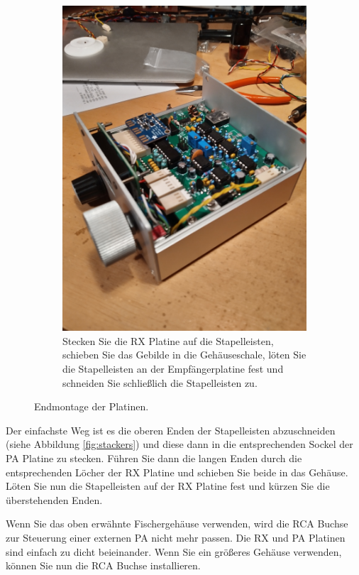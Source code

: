 \documentclass[10pt, a4paper,twoside]{scrartcl}
\begin{document}
\begin{figure}[!ht]
\begin{subfigure}{0.49\linewidth}
  \includegraphics[width=\linewidth]{fig/final_small.png}
  \caption{Stecken Sie die RX Platine auf die Stapelleisten, schieben Sie das Gebilde in die Gehäuseschale, löten Sie die Stapelleisten an der Empfängerplatine fest und schneiden Sie schließlich die Stapelleisten zu.}  \label{fig:final}
 \end{subfigure}
 \caption{Endmontage der Platinen.}
\end{figure}

Der einfachste Weg ist es die oberen Enden der Stapelleisten abzuschneiden (siehe Abbildung \ref{fig:stackers}) und diese dann in die entsprechenden Sockel der PA Platine zu stecken. Führen Sie dann die langen Enden durch die entsprechenden Löcher der RX Platine und schieben Sie beide in das Gehäuse. Löten Sie nun die Stapelleisten auf der RX Platine fest und kürzen Sie die überstehenden Enden.

Wenn Sie das oben erwähnte Fischergehäuse verwenden, wird die RCA Buchse zur Steuerung einer externen PA nicht mehr passen. Die RX und PA Platinen sind einfach zu dicht beieinander. Wenn Sie ein größeres Gehäuse verwenden, können Sie nun die RCA Buchse installieren.
\end{document}
